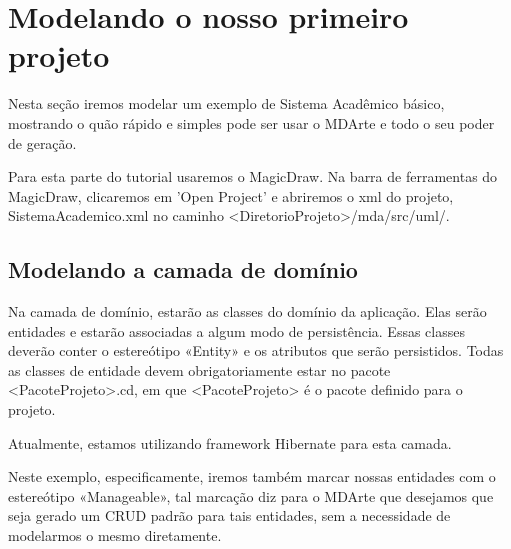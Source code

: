 \section{Modelando o nosso primeiro projeto}

Nesta seção iremos modelar um exemplo de Sistema Acadêmico básico, mostrando o quão rápido e simples pode ser usar o MDArte e todo o seu poder de geração.

Para esta parte do tutorial usaremos o MagicDraw. Na barra de ferramentas do MagicDraw, clicaremos em 'Open Project' e abriremos o xml do projeto, SistemaAcademico.xml no caminho <DiretorioProjeto>/mda/src/uml/.

\subsection{Modelando a camada de domínio}
Na camada de domínio, estarão as classes do domínio da aplicação. Elas serão entidades e estarão associadas a algum modo de persistência. Essas classes deverão conter o estereótipo «Entity» e os atributos que serão persistidos. Todas as classes de entidade devem obrigatoriamente estar no pacote <PacoteProjeto>.cd, em que <PacoteProjeto> é o pacote definido para o projeto.

Atualmente, estamos utilizando framework Hibernate para esta camada. 

Neste exemplo, especificamente, iremos também marcar nossas entidades com o estereótipo «Manageable», tal marcação diz para o MDArte que desejamos que seja gerado um CRUD padrão para tais entidades, sem a necessidade de modelarmos o mesmo diretamente.

